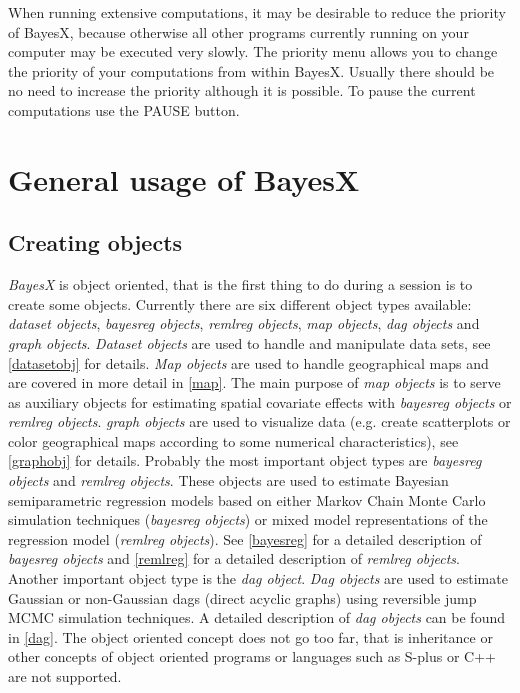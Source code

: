 When running extensive computations, it may be desirable to reduce
the priority of BayesX, because otherwise all other programs
currently running on your computer may be executed very slowly.
The priority menu allows you to change the priority of your
computations from within BayesX. Usually there should be no need
to increase the priority although it is possible. To pause the
current computations use the PAUSE button.

\section{General usage of BayesX}
\label{generalusage}

\subsection{Creating objects}
\label{createobject}

  {\em BayesX} is object
oriented, that is the first thing to do during a session is to
create some objects. Currently there are six different object
types available: {\em dataset objects}, {\em bayesreg objects},
{\em remlreg objects}, {\em map objects}, {\em dag objects} and {\em
graph objects}. {\em Dataset objects} are used to handle and
manipulate data sets, see \autoref{datasetobj} for details. {\em Map
objects} are used to handle geographical maps and are covered in
more detail in \autoref{map}. The main purpose of {\em map objects} is
to serve as auxiliary objects for estimating spatial covariate
effects with {\em bayesreg objects} or {\em remlreg objects}. {\em
graph objects} are used to visualize data (e.g. create
scatterplots or color geographical maps according to some
numerical characteristics), see \autoref{graphobj} for details.
Probably the most important object types are {\em bayesreg
objects} and {\em remlreg objects}. These objects are used to
estimate Bayesian semiparametric regression models based on either
Markov Chain Monte Carlo simulation techniques ({\em bayesreg
objects}) or mixed model representations of the regression model
({\em remlreg objects}). See \autoref{bayesreg} for a detailed
description of {\em bayesreg objects} and \autoref{remlreg} for a
detailed description of {\em remlreg objects}. Another important
object type is the {\em dag object}. {\em Dag objects} are used to
estimate Gaussian or non-Gaussian dags (direct acyclic graphs)
using reversible jump MCMC simulation techniques. A detailed
description of {\em dag objects} can be found in \autoref{dag}.
The object oriented concept does not go too far, that is
inheritance or other concepts of object oriented programs or
languages such as S-plus or C++ are not supported.

